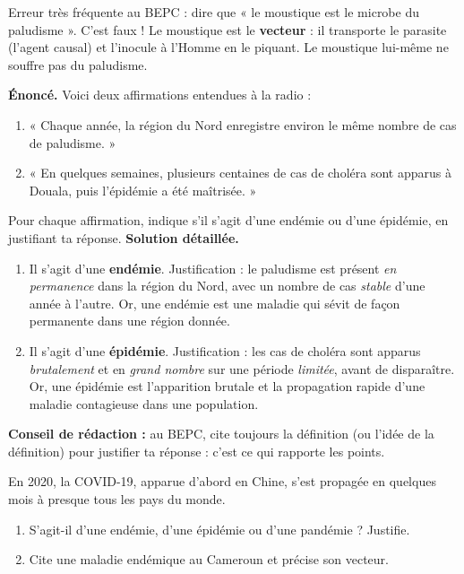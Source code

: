 \documentclass[11pt]{article}
\begin{document}
\begin{attention}
Erreur très fréquente au BEPC : dire que « le moustique est le microbe du paludisme ». C'est faux ! Le moustique est le \textbf{vecteur} : il transporte le parasite (l'agent causal) et l'inocule à l'Homme en le piquant. Le moustique lui-même ne souffre pas du paludisme.
\end{attention}

\begin{exoresolu}
\textbf{Énoncé.} Voici deux affirmations entendues à la radio :
\begin{enumerate}
\item « Chaque année, la région du Nord enregistre environ le même nombre de cas de paludisme. »
\item « En quelques semaines, plusieurs centaines de cas de choléra sont apparus à Douala, puis l'épidémie a été maîtrisée. »
\end{enumerate}
Pour chaque affirmation, indique s'il s'agit d'une endémie ou d'une épidémie, en justifiant ta réponse.
\tcblower
\textbf{Solution détaillée.}
\begin{enumerate}
\item Il s'agit d'une \textbf{endémie}. Justification : le paludisme est présent \emph{en permanence} dans la région du Nord, avec un nombre de cas \emph{stable} d'une année à l'autre. Or, une endémie est une maladie qui sévit de façon permanente dans une région donnée.
\item Il s'agit d'une \textbf{épidémie}. Justification : les cas de choléra sont apparus \emph{brutalement} et en \emph{grand nombre} sur une période \emph{limitée}, avant de disparaître. Or, une épidémie est l'apparition brutale et la propagation rapide d'une maladie contagieuse dans une population.
\end{enumerate}
\textbf{Conseil de rédaction :} au BEPC, cite toujours la définition (ou l'idée de la définition) pour justifier ta réponse : c'est ce qui rapporte les points.
\end{exoresolu}

\begin{exercice}
En 2020, la COVID-19, apparue d'abord en Chine, s'est propagée en quelques mois à presque tous les pays du monde.
\begin{enumerate}
\item S'agit-il d'une endémie, d'une épidémie ou d'une pandémie ? Justifie.
\item Cite une maladie endémique au Cameroun et précise son vecteur.
\end{enumerate}
\end{exercice}
\end{document}

